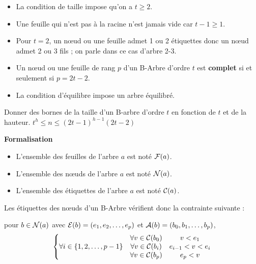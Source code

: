 \begin{itemize}
\item La condition de taille impose qu'on a $t\ge 2$. 

\item Une feuille qui n'est pas à la racine n'est jamais vide car $t-1\ge 1$.

\item Pour $t=2$, un nœud ou une feuille admet 1 ou 2 étiquettes donc un nœud admet 2 ou 3 fils ; on parle dans ce cas d'arbre 2-3.

\item Un nœud ou une feuille de rang $p$ d’un B-Arbre d’ordre $t$ est {\bf complet} si et seulement si $p  = 2t-2$.
\item La condition d'équilibre impose un arbre équilibré.
\end{itemize}
\begin{question}{}{}
Donner des bornes de la taille d'un B-arbre d'ordre $t$ en fonction de $t$ et de la hauteur.
\reponse
$t^h \le n \le (2t-1)^{h-1}(2t-2)$
\end{question}
{\bf Formalisation}
\begin{itemize}
    \item L’ensemble des feuilles de l’arbre $a$ est noté ${\cal F}(a)$. 

    \item L’ensemble des nœuds de l’arbre $a$ est noté ${\cal N}(a)$.

    \item L’ensemble des étiquettes de l’arbre $a$ est noté ${\cal C}(a)$.
\end{itemize}

Les étiquettes des nœuds d’un B-Arbre vérifient donc la contrainte suivante :

pour $b\in {\cal N}(a)$ avec ${\cal E}(b) = (e_1 , e_2, \ldots, e_{p})$ et ${\cal A}(b) = (b_0 , b_1, \ldots, b_p)$,
\[\left\{\begin{matrix}
&\forall v \in {\cal C}(b_0)& v < e_1\\
\forall i\in \{1, 2, \ldots, p-1\}& \forall v\in {\cal C}(b_i)& e_{i-1} < v < e_i\\
&\forall v\in {\cal C}(b_p)& e_p  < v
\end{matrix}\right.\]
